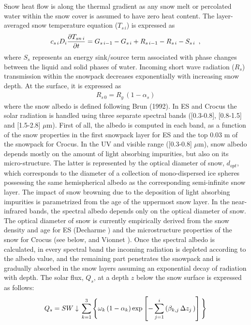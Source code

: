 Snow heat flow is along the thermal gradient
as any snow melt or percolated water within the snow cover
is assumed to have zero heat content.
The layer-averaged snow temperature equation
($T_{s\,i}$) is expressed as
%
\begin{eqnarray}
c_{s\,i} D_i {\partial T_{sn\,i}\over\partial t}
= G_{s\,i-1} - G_{s\,i} + R_{s\,i-1} - R_{s\,i}  - S_{s\,i}
\,\,\,,
\end{eqnarray}
%
where $S_s$ represents an energy sink/source term associated with
phase changes between the liquid and solid phases of water.
Incoming short wave radiation ($R_s$)
transmission within the snowpack decreases exponentially
with increasing snow depth. At the surface, it is expressed as
%
\begin{eqnarray}
R_{s\,0} = R_g \,\left(1-\alpha_s\right)
\end{eqnarray}
%
where the snow albedo is defined  following Brun \etal (1992). In ES
and Crocus the solar radiation is handled using three separate
spectral bands ([0.3-0.8], [0.8-1.5] and [1.5-2.8] $\mu$m). First of all,
the albedo is computed in each band, as a function of the snow
properties in the first snowpack layer for ES and the top 0.03 m of the
snowpack for Crocus. In the UV and visible range ([0.3-0.8] $\mu$m), snow
albedo depends mostly on the amount of light absorbing impurities, but
also on its micro-structure. The latter is represented by the optical
diameter of snow, $d_{opt}$, which corresponds to the diameter of a
collection of mono-dispersed ice spheres possessing the same
hemispherical albedo as the corresponding semi-infinite snow
layer. The impact of snow browning due to the deposition of light
absorbing impurities is parametrized from the age of the uppermost
snow layer. In the near-infrared bands, the spectral albedo depends
only on the optical diameter of snow. The optical diameter of
snow is currently empirically derived from the snow density and age
for ES (Decharme ) and the microstructure properties of the
snow for Crocus (see below, and Vionnet ). Once the
spectral albedo is calculated, in every spectral band the incoming
radiation is depleted according to the albedo value, and the remaining
part penetrates the snowpack and is gradually absorbed in the snow
layers assuming an exponential decay of radiation with depth. The
solar flux, $Q_s$, at a depth $z$ below the snow surface is expressed as
follows:
%
\begin{equation}
Q_s = SW\downarrow \, \sum^3_{k=1}
\Bigg\lbrace
\omega_k \left(1-\alpha_k\right)
{\rm exp}\left[
-\sum^i_{j=1}
\left(
\beta_{k,j}\,\Delta z_j \, 
\right)
\right]
\Bigg\rbrace
\end{equation}
